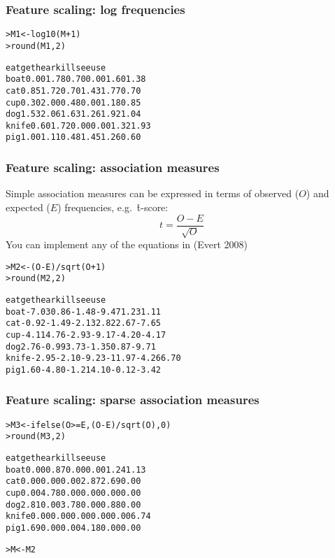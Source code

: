 \begin{frame}[fragile]
  \frametitle{Feature scaling: log frequencies}

\ungap
\begin{alltt}\small
{}

> M1 <- log10(M + 1)  
> round(M1, 2) \begin{Rout}
         eat  get hear kill  see  use
  boat  0.00 1.78 0.70 0.00 1.60 1.38
  cat   0.85 1.72 0.70 1.43 1.77 0.70
  cup   0.30 2.00 0.48 0.00 1.18 0.85
  dog   1.53 2.06 1.63 1.26 1.92 1.04
  knife 0.60 1.72 0.00 0.00 1.32 1.93
  pig   1.00 1.11 0.48 1.45 1.26 0.60
\end{Rout}
\end{alltt}
\end{frame}

\begin{frame}[fragile]
  \frametitle{Feature scaling: association measures}

  Simple association measures can be expressed in terms of observed ($O$) and
  expected ($E$) frequencies, e.g.\ \h{t-score}:
  \[
  t = \frac{O - E}{\sqrt{O}}
  \]
  You can implement any of the equations in (Evert 2008)

\begin{alltt}\small
> M2 <- (O - E) / sqrt(O + 1)  
> round(M2, 2) \begin{Rout}
           eat    get   hear   kill    see    use
  boat   -7.03   0.86  -1.48  -9.47   1.23   1.11
  cat    -0.92  -1.49  -2.13   2.82   2.67  -7.65
  cup    -4.11   4.76  -2.93  -9.17  -4.20  -4.17
  dog     2.76  -0.99   3.73  -1.35   0.87  -9.71
  knife  -2.95  -2.10  -9.23 -11.97  -4.26   6.70
  pig     1.60  -4.80  -1.21   4.10  -0.12  -3.42 \end{Rout}
\end{alltt}
\end{frame}

\begin{frame}[fragile]
  \frametitle{Feature scaling: sparse association measures}

\ungap
\begin{alltt}\small
{}
> M3 <- ifelse(O >= E, (O - E) / sqrt(O), 0) 
> round(M3, 2) \begin{Rout}
         eat  get hear kill  see  use
  boat  0.00 0.87 0.00 0.00 1.24 1.13
  cat   0.00 0.00 0.00 2.87 2.69 0.00
  cup   0.00 4.78 0.00 0.00 0.00 0.00
  dog   2.81 0.00 3.78 0.00 0.88 0.00
  knife 0.00 0.00 0.00 0.00 0.00 6.74
  pig   1.69 0.00 0.00 4.18 0.00 0.00 \end{Rout}

> M <- M2
\end{alltt}
\end{frame}

